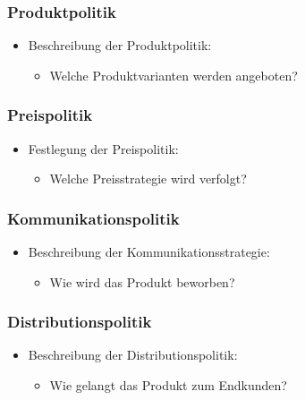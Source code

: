 \subsubsection{Produktpolitik}\label{produktpolitik}

\begin{itemize}
\item
  Beschreibung der Produktpolitik:

  \begin{itemize}
  
  \item
    Welche Produktvarianten werden angeboten?
  \end{itemize}
\end{itemize}

\subsubsection{Preispolitik}\label{preispolitik}

\begin{itemize}
\item
  Festlegung der Preispolitik:

  \begin{itemize}
  
  \item
    Welche Preisstrategie wird verfolgt?
  \end{itemize}
\end{itemize}

\subsubsection{Kommunikationspolitik}\label{kommunikationspolitik}

\begin{itemize}
\item
  Beschreibung der Kommunikationsstrategie:

  \begin{itemize}
  
  \item
    Wie wird das Produkt beworben?
  \end{itemize}
\end{itemize}

\subsubsection{Distributionspolitik}\label{distributionspolitik}

\begin{itemize}
\item
  Beschreibung der Distributionspolitik:

  \begin{itemize}
  
  \item
    Wie gelangt das Produkt zum Endkunden?
  \end{itemize}
\end{itemize}

